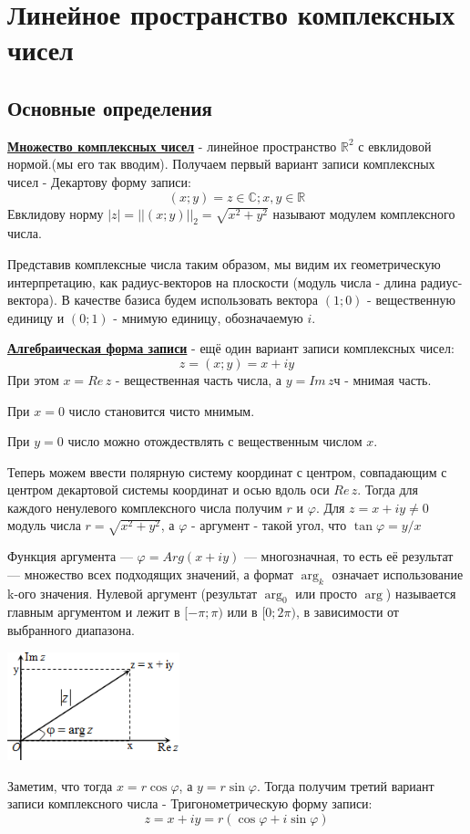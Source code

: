 \documentclass[twoside]{book}
\newcommand{\deff}[1]{\underline{\textbf{#1}}}
\begin{document}
\section{Линейное пространство комплексных чисел}
\subsection{Основные определения}
\deff{Множество комплексных чисел} - линейное пространство \(\mathbb{R}^2\) с евклидовой нормой.(мы его так вводим).
Получаем первый вариант записи комплексных чисел - Декартову форму записи: $$(x; y)=z\in\mathbb{C}; x, y\in\mathbb{R}$$
Евклидову норму \(|z|=||(x;y)||_2=\sqrt{x^2 + y^2}\) называют модулем комплексного числа.

Представив комплексные числа таким образом, мы видим их геометрическую интерпретацию, как радиус-векторов на плоскости (модуль числа - длина радиус-вектора). В качестве базиса будем использовать вектора \((1;0)\) - вещественную единицу и \((0;1)\) - мнимую единицу, обозначаемую $i$.

\deff{Алгебраическая форма записи} - ещё один вариант записи комплексных чисел:
$$z=(x;y)=x+iy$$
При этом \(x=Re\,z\) - вещественная часть числа, а \(y=Im\,z\)ч - мнимая часть.

При \(x=0\) число становится чисто мнимым.

При \(y=0\) число можно отождествлять с вещественным числом \(x\).

Теперь можем ввести полярную систему координат с центром, совпадающим с центром декартовой системы координат и осью вдоль оси \(Re\,z\). Тогда для каждого ненулевого комплексного числа получим \(r\) и \(\varphi\). Для \(z=x+iy\neq0\) модуль числа \(r=\sqrt{x^2 + y^2}\), а \(\varphi\) - аргумент - такой угол, что \(\tan{\varphi}= y/x\)

Функция аргумента --- \(\varphi=Arg(x+iy)\) --- многозначная, то есть её результат --- множество всех подходящих значений, а формат \(\arg_k\) означает использование k-ого значения. Нулевой аргумент (результат \(\arg_0\) или просто \(\arg\)) называется главным аргументом и лежит в \([-\pi;\pi)\) или в \([0;2\pi)\), в зависимости от выбранного диапазона.
\begin{center}
    \includegraphics[width=5cm]{Images/Chapter_2/2-2-1.png}
\end{center}
Заметим, что тогда \(x=r\cos{\varphi}\), а \(y=r\sin{\varphi}\). Тогда получим третий вариант записи комплексного числа - Тригонометрическую форму записи: $$z=x+iy=r(\cos{\varphi}+i\sin{\varphi})$$
\end{document}
